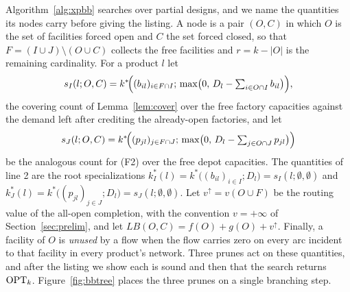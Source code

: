 Algorithm~\ref{alg:xpbb} searches over partial designs, and we name the
quantities its nodes carry before giving the listing. A node is a pair
$(O,C)$ in which $O$ is the set of facilities forced open and $C$ the set
forced closed, so that $F=(I\cup J)\setminus(O\cup C)$ collects the free
facilities and $r=k-|O|$ is the remaining cardinality. For a product $l$
let
\[
s_I(l;O,C)=k^\ast\!\Bigl((b_{il})_{i\in F\cap I};\,\max\bigl(0,\,D_l-\textstyle
\sum_{i\in O\cap I}b_{il}\bigr)\Bigr),
\]
the covering count of Lemma~\ref{lem:cover} over the free factory
capacities against the demand left after crediting the already-open
factories, and let
\[
s_J(l;O,C)=k^\ast\!\Bigl((p_{jl})_{j\in F\cap J};\,\max\bigl(0,\,D_l-\textstyle
\sum_{j\in O\cap J}p_{jl}\bigr)\Bigr)
\]
be the analogous count for (F2) over the free depot capacities. The
quantities of line 2 are the root specializations
$k^\ast_I(l)=k^\ast\bigl((b_{il})_{i\in I};D_l\bigr)=s_I(l;\emptyset,\emptyset)$
and
$k^\ast_J(l)=k^\ast\bigl((p_{jl})_{j\in J};D_l\bigr)=s_J(l;\emptyset,\emptyset)$.
Let $v^{\uparrow}=v(O\cup F)$ be the routing value of the all-open
completion, with the convention $v=+\infty$ of
Section~\ref{sec:prelim}, and let $LB(O,C)=f(O)+g(O)+v^{\uparrow}$.
Finally, a facility of $O$ is \emph{unused} by a flow when the flow
carries zero on every arc incident to that facility in every product's
network. Three prunes act on these quantities, and after the listing we
show each is sound and then that the search returns $\mathrm{OPT}_k$.
Figure~\ref{fig:bbtree} places the three prunes on a single branching
step.



